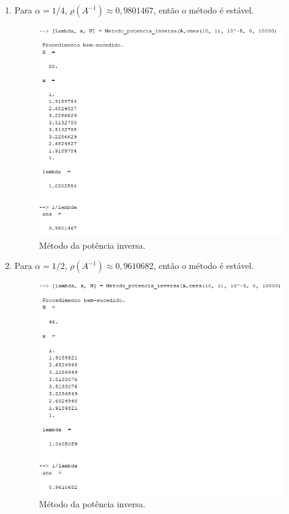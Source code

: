 \documentclass[11pt]{article}
\begin{document}
\begin{enumerate}
\begin{enumerate}
    \item Para $\alpha = 1/4$, $\rho(A^{-1})\approx0,9801467$, então o método é estável.

\begin{figure}[H]
    \centering
    \includegraphics[]{5-a}
    \caption{Método da potência inversa.}
\end{figure}

    \item Para $\alpha = 1/2$, $\rho(A^{-1})\approx0,9610682$, então o método é estável.

\begin{figure}[H]
    \centering
    \includegraphics[]{5-b}
    \caption{Método da potência inversa.}
\end{figure}


\end{enumerate}
\end{enumerate}
\end{document}
